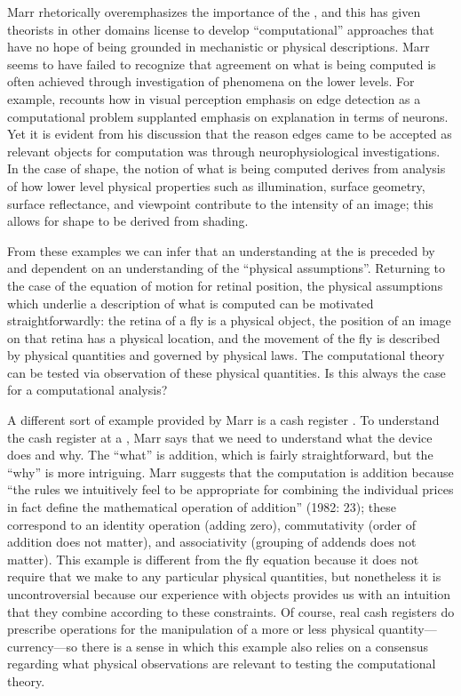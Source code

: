   Marr rhetorically overemphasizes the importance of the , and this has given theorists in other domains license to develop “computational” approaches that have no hope of being grounded in mechanistic or physical descriptions. Marr seems to have failed to recognize that agreement on what is being computed is often achieved through investigation of phenomena on the lower levels. For example, \citet{Marr1982} recounts how in visual perception emphasis on edge detection as a computational problem supplanted emphasis on explanation in terms of neurons. Yet it is evident from his discussion that the reason edges came to be accepted as relevant objects for computation was through neurophysiological investigations. In the case of shape, the notion of what is being computed derives from analysis of how lower level physical properties such as illumination, surface geometry, surface reflectance, and viewpoint contribute to the intensity of an image; this allows for shape to be derived from shading. 

From these examples we can infer that an understanding at the  is preceded by and dependent on an understanding of the “physical assumptions”. Returning to the case of the equation of motion for retinal position, the physical assumptions which underlie a description of what is computed can be motivated straightforwardly: the retina of a fly is a physical object, the position of an image on that retina has a physical location, and the movement of the fly is described by physical quantities and governed by physical laws. The computational theory can be tested via observation of these physical quantities. Is this always the case for a computational analysis?

A different sort of example provided by Marr is a cash register \citep{Marr1982}. To understand the cash register at a , Marr says that we need to understand what the device does and why. The “what” is addition, which is fairly straightforward, but the “why” is more intriguing. Marr suggests that the computation is addition because “the rules we intuitively feel to be appropriate for combining the individual prices in fact define the mathematical operation of addition” (1982: 23); these correspond to an identity operation (adding zero), commutativity (order of addition does not matter), and associativity (grouping of addends does not matter). This example is different from the fly equation because it does not require that we make  to any particular physical quantities, but nonetheless it is uncontroversial because our experience with objects provides us with an intuition that they combine according to these constraints. Of course, real cash registers do prescribe operations for the manipulation of a more or less physical quantity—currency—so there is a sense in which this example also relies on a consensus regarding what physical observations are relevant to testing the computational theory.

